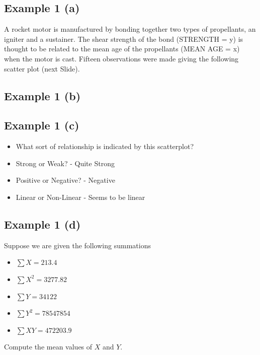 \documentclass[]{report}
\begin{document}

\subsection{Example 1 (a)}
A rocket motor is manufactured by bonding together two types of
propellants, an igniter and a sustainer.
The shear strength of the bond (STRENGTH = y)
is thought to be related to the mean age of the propellants (MEAN AGE = x) when the motor is cast.
Fifteen observations were made giving the following scatter plot (next Slide).



\subsection{Example 1 (b)}

%


\subsection{Example 1 (c)}
\begin{itemize}
	\item What sort of relationship is indicated by this scatterplot?
	\item Strong or Weak?  - Quite Strong
	\item Positive or Negative?  - Negative
	\item Linear or Non-Linear - Seems to be linear
\end{itemize}


\subsection{Example 1 (d)}
Suppose we are given the following summations
\begin{itemize}
	\item $\sum X = 213.4$
	\item $\sum X^2 =3277.82$
	\item $\sum Y = 34122$
	\item $\sum Y^2 = 78547854$
	\item $\sum XY = 472203.9$
\end{itemize}
Compute the mean values of $X$ and $Y$.
\end{document}
